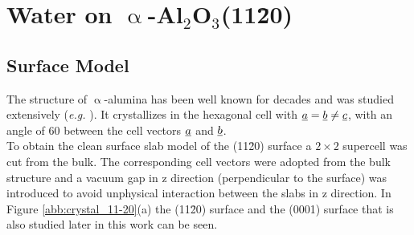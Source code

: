 \documentclass[11pt,DIV=13,BCOR=5mm,a4paper,headinclude]{scrbook}
\begin{document}
\chapter{Water on $\upalpha$-Al$_2$O$_3$(11\=20)}
\section{Surface Model}
The structure of $\upalpha$-alumina has been well known for decades and was studied extensively (\textit{e.g.} \cite{Passerini1930,wyckoff1931}).
It crystallizes in the hexagonal cell with $\uline{a}=\uline{b}\neq \uline{c}$, with an angle of $60$\textdegree{} between the cell vectors $\uline{a}$ and $\uline{b}$.
\\
To obtain the clean surface slab model of the (11\=20) surface a $2\times 2$ supercell was cut from the bulk.
The corresponding cell vectors were adopted from the bulk structure and a vacuum gap in z direction (perpendicular to the surface) was introduced to avoid unphysical interaction between the slabs in z direction.
In Figure \ref{abb:crystal_11-20}(a) the (11\=20) surface and the (0001) surface that is also studied later in this work can be seen.
\end{document}
